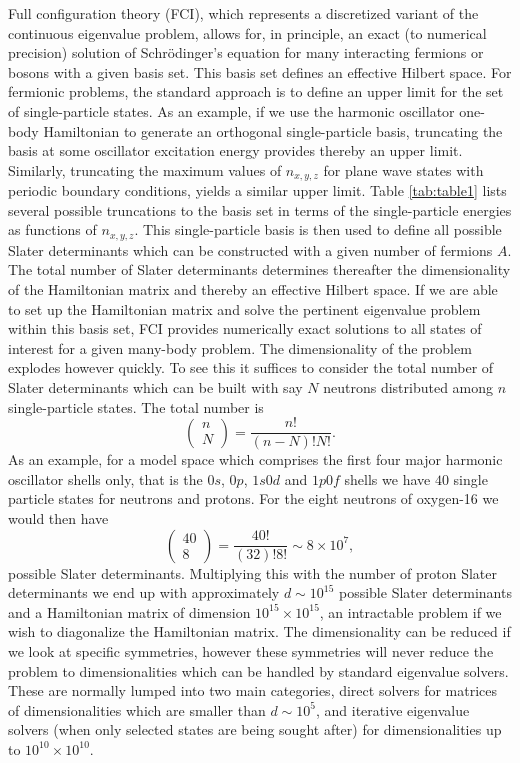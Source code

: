   Full configuration theory (FCI), which represents a discretized
  variant of the continuous eigenvalue problem, allows for, in
  principle, an exact (to numerical precision) solution of Schr\"odinger's equation
  for many interacting fermions or bosons with a given basis set. This
  basis set defines an effective Hilbert space.  For fermionic
  problems, the standard approach is to define an upper limit for the
  set of single-particle states. As an example, if we use the harmonic
  oscillator one-body Hamiltonian to generate an orthogonal
  single-particle basis, truncating the basis at some oscillator
  excitation energy provides thereby an upper limit.  Similarly,
  truncating the maximum values of $n_{x,y,z}$ for plane wave states
  with periodic boundary conditions, yields a similar upper limit.
  Table \ref{tab:table1} lists several possible truncations to the
  basis set in terms of the single-particle energies as functions of
  $n_{x,y,z}$.  This single-particle basis is then used to define all
  possible Slater determinants which can be constructed with a given
  number of fermions $A$.  The total number of Slater determinants
  determines thereafter the dimensionality of the Hamiltonian matrix
  and thereby an effective Hilbert space. 
  If we are able to set up the Hamiltonian matrix
  and solve the pertinent eigenvalue problem within this basis set,
  FCI provides numerically exact solutions to all states of interest
  for a given many-body problem. The dimensionality of the problem
  explodes however quickly. To see this it suffices to consider
  the total number of Slater determinants which can be built with say
  $N$ neutrons distributed among $n$ single-particle states. The total number is
  \[
  \left (\begin{array}{c} n \\ N\end{array} \right)
    =\frac{n!}{(n-N)!N!}.
  \]
  As an example, for a model space which comprises the first four
  major harmonic oscillator shells only, that is the $0s$, $0p$,
  $1s0d$ and $1p0f$ shells we have $40$ single particle states for
  neutrons and protons.  For the eight neutrons of oxygen-16 we would
  then have
  \[
  \left (\begin{array}{c} 40 \\ 8\end{array} \right)
    =\frac{40!}{(32)!8!}\sim 8\times 10^{7},
  \]
  possible Slater determinants. Multiplying this with the number of
  proton Slater determinants we end up with approximately $d\sim 10^{15}$ 
  possible Slater determinants and a Hamiltonian matrix of
  dimension $10^{15}\times 10^{15}$, an intractable problem if we wish to diagonalize the Hamiltonian matrix. The
  dimensionality can be reduced if we look at specific symmetries,
  however these symmetries will never reduce the problem to
  dimensionalities which can be handled by standard eigenvalue
  solvers. These are normally lumped into two main categories, direct
  solvers for matrices of dimensionalities which are smaller than
  $d\sim 10^5$, and iterative eigenvalue solvers (when only selected
  states are being sought after) for dimensionalities up to
  $10^{10}\times 10^{10}$.

